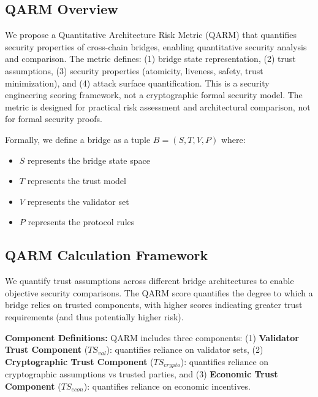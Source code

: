 \documentclass[runningheads]{llncs}
\begin{document}
\subsection{QARM Overview}
We propose a Quantitative Architecture Risk Metric (QARM) that quantifies security properties of cross-chain bridges, enabling quantitative security analysis and comparison. The metric defines: (1) bridge state representation, (2) trust assumptions, (3) security properties (atomicity, liveness, safety, trust minimization), and (4) attack surface quantification. This is a security engineering scoring framework, not a cryptographic formal security model. The metric is designed for practical risk assessment and architectural comparison, not for formal security proofs.

Formally, we define a bridge as a tuple $B = (S, T, V, P)$ where:
\begin{itemize}
    \item $S$ represents the bridge state space
    \item $T$ represents the trust model
    \item $V$ represents the validator set
    \item $P$ represents the protocol rules
\end{itemize}

\subsection{QARM Calculation Framework}
We quantify trust assumptions across different bridge architectures to enable objective security comparisons. The QARM score quantifies the degree to which a bridge relies on trusted components, with higher scores indicating greater trust requirements (and thus potentially higher risk).

\textbf{Component Definitions:} QARM includes three components: (1) \textbf{Validator Trust Component} ($TS_{val}$): quantifies reliance on validator sets, (2) \textbf{Cryptographic Trust Component} ($TS_{crypto}$): quantifies reliance on cryptographic assumptions vs trusted parties, and (3) \textbf{Economic Trust Component} ($TS_{econ}$): quantifies reliance on economic incentives.
\end{document}
